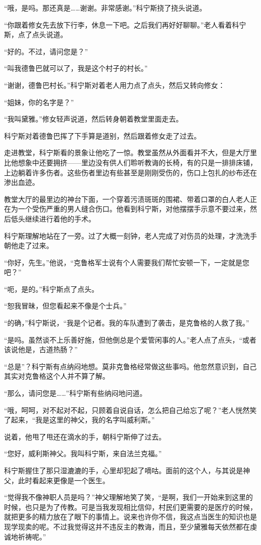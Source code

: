 “哦，是吗。那还真是……谢谢。非常感谢。”科宁斯挠了挠头说道。

“你跟着修女先去放下行李，休息一下吧。之后我们再好好聊聊。”老人看着科宁斯，点了点头说道。

“好的。不过，请问您是？”

“叫我德鲁巴就可以了，我是这个村子的村长。”

“谢谢，德鲁巴村长。”科宁斯对着老人用力点了点头，然后又转向修女：

“姐妹，你的名字是？”

“我叫黛雅。”修女轻声说道，然后转身朝着教堂里面走去。

科宁斯对着德鲁巴挥了下手算是道别，然后跟着修女走了过去。

走进教堂，科宁斯看的景象让他吃了一惊。教堂虽然从外面看并不大，但是大厅里比他想象中还要拥挤——里边没有供人们聆听教诲的长椅，有的只是一排排床铺，上边躺着许多伤者。这些伤者里边有些甚至是刚刚受伤的，伤口上包扎的纱布还在渗出血迹。

教堂大厅的最里边的神台下面，一个穿着污渍斑斑的围裙、带着口罩的白人老人正在为一个受伤严重的男人缝合伤口。他看到科宁斯，对他摆摆手示意不要过来，然后低头继续进行着他的手术。

科宁斯理解地站在了一旁。过了大概一刻钟，老人完成了对伤员的处理，才洗洗手朝他走了过来。

“你好，先生。”他说，“克鲁格军士说有个人需要我们帮忙安顿一下，一定就是您吧？”

“呃，是的。”科宁斯点了点头。

“恕我冒昧，但您看起来不像是个士兵。”

“的确，”科宁斯说，“我是个记者。我的车队遭到了袭击，是克鲁格的人救了我。”

“是吗。虽然谈不上乐善好施，但他倒总是个爱管闲事的人。”老人点了点头，“或者该说他是，古道热肠？”

“总是”？科宁斯有点纳闷地想。莫非克鲁格经常做这些事吗。他忽然意识到，自己其实对克鲁格这个人并不算了解。

“那么，请问您是……”科宁斯有些纳闷地问道。

“哦，呵呵，对不起对不起，只顾着自说自话，怎么把自己给忘了呢？”老人恍然笑了起来，“我是这里的神父，我的名字叫威利斯。”

说着，他甩了甩还在滴水的手，朝科宁斯伸了过去。

“您好，威利斯神父。我叫科宁斯，来自法兰克福。”

科宁斯握住了那只湿漉漉的手，心里却犯起了嘀咕。面前的这个人，与其说是神父，此时看起来更像是一个医生。

“觉得我不像神职人员是吗？”神父理解地笑了笑，“是啊，我们一开始来到这里的时候，也只是为了传教。可是当我发现相比信仰，村民们更需要的是医疗的时候，就把更多的精力放在了眼下的事情上。说来也许你不信，我这点当医生的知识也是现学现卖的呢。不过我觉得这并不违反主的教诲，而且，至少黛雅每天依然都在虔诚地祈祷呢。”

